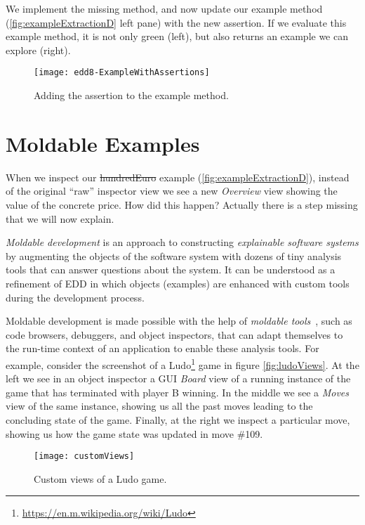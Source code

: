 \documentclass[acmsmall,screen,authorversion,nonacm]{acmart} %
\begin{document}
We implement the missing method, and now update our example method (\autoref{fig:exampleExtractionD} left pane) with the new assertion.
If we evaluate this example method, it is not only green (left), but also returns an example we can explore (right).

\begin{figure}[h]
  \texttt{[image: edd8-ExampleWithAssertions]}
	\caption{Adding the assertion to the example method.}
  \label{fig:exampleExtractionD}
\end{figure}

\section{Moldable Examples}\label{sec:moldable}

When we inspect our \st{hundredEuro} example (\autoref{fig:exampleExtractionD}), instead of the original ``raw'' inspector view we see a new \emph{Overview} view showing the value of the concrete price.
How did this happen?
Actually there is a step missing that we will now explain.

\emph{Moldable development} is an approach to constructing \emph{explainable software systems} by augmenting the objects of the software system with dozens of tiny analysis tools that can answer questions about the system.
It can be understood as a refinement of EDD in which objects (examples) are enhanced with custom tools during the development process.

Moldable development is made possible with the help of \emph{moldable tools}~\cite{Chis17a}, such as code browsers, debuggers, and object inspectors, that can adapt themselves to the run-time context of an application to enable these analysis tools.
For example, consider the screenshot of a Ludo\footnote{\href{https://web.archive.org/web/20240530004250/https://en.m.wikipedia.org/wiki/Ludo}{https://en.m.wikipedia.org/wiki/Ludo}} game in figure \autoref{fig:ludoViews}.
At the left we see in an object inspector a GUI \emph{Board} view of a running instance of the game that has terminated with player B winning.
In the middle we see a \emph{Moves} view of the same instance, showing us all the past moves leading to the concluding state of the game.
Finally, at the right we inspect a particular move, showing us how the game state was updated in move \#109.

\begin{figure}[h]
  \texttt{[image: customViews]}
  \caption{Custom views of a Ludo game.}
  \label{fig:ludoViews}
\end{figure}
\end{document}
